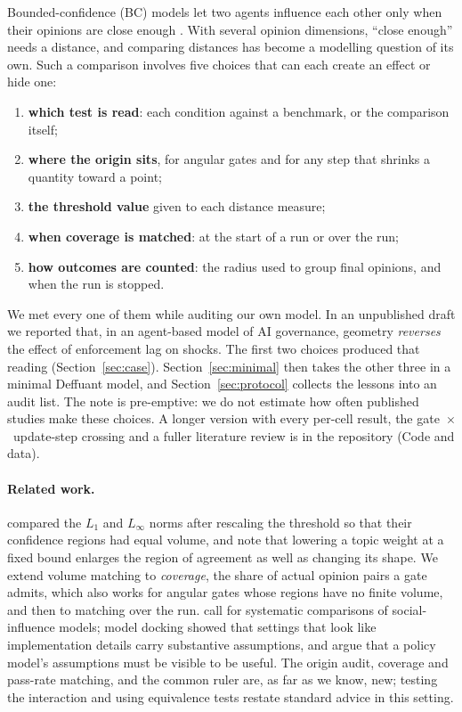 \documentclass[11pt]{article}
\begin{document}
Bounded-confidence (BC) models let two agents influence each other only when their opinions are close enough \citep{deffuant2000,hegselmann2002}.
With several opinion dimensions, ``close enough'' needs a distance, and comparing distances has become a modelling question of its own.
Such a comparison involves five choices that can each create an effect or hide one:
\begin{enumerate}
\item \textbf{which test is read}: each condition against a benchmark, or the comparison itself;
\item \textbf{where the origin sits}, for angular gates and for any step that shrinks a quantity toward a point;
\item \textbf{the threshold value} given to each distance measure;
\item \textbf{when coverage is matched}: at the start of a run or over the run;
\item \textbf{how outcomes are counted}: the radius used to group final opinions, and when the run is stopped.
\end{enumerate}
We met every one of them while auditing our own model.
In an unpublished draft we reported that, in an agent-based model of AI governance, geometry \emph{reverses} the effect of enforcement lag on shocks.
The first two choices produced that reading (Section~\ref{sec:case}).
Section~\ref{sec:minimal} then takes the other three in a minimal Deffuant model, and Section~\ref{sec:protocol} collects the lessons into an audit list.
The note is pre-emptive: we do not estimate how often published studies make these choices.
A longer version with every per-cell result, the gate~$\times$~update-step crossing and a fuller literature review is in the repository (Code and data).

\paragraph{Related work.}
\citet{lorenz2008} compared the $L_1$ and $L_\infty$ norms after rescaling the threshold so that their confidence regions had equal volume, and \citet{li2026} note that lowering a topic weight at a fixed bound enlarges the region of agreement as well as changing its shape.
We extend volume matching to \emph{coverage}, the share of actual opinion pairs a gate admits, which also works for angular gates whose regions have no finite volume, and then to matching over the run.
\citet{flache2017} call for systematic comparisons of social-influence models; model docking \citep{axtell1996,wilensky2007} showed that settings that look like implementation details carry substantive assumptions, and \citet{gilbert2018} argue that a policy model's assumptions must be visible to be useful.
The origin audit, coverage and pass-rate matching, and the common ruler are, as far as we know, new; testing the interaction \citep{gelman2006} and using equivalence tests \citep{lakens2017} restate standard advice in this setting.
\end{document}
